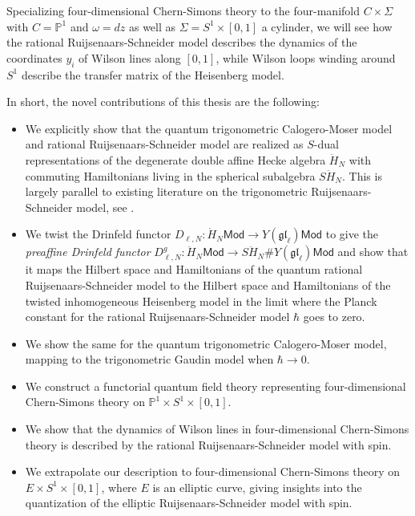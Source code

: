 \documentclass[11pt]{report}
\theoremstyle{definition}
\theoremstyle{remark}
\theoremstyle{remark}
\renewcommand{\P}{\mathbb{P}}
\begin{document}
Specializing four-dimensional Chern-Simons theory to the four-manifold $C \times \Sigma$ with $C = \P^1$ and $\omega = dz$ as well as $\Sigma = S^1 \times [0,1]$ a cylinder, we will see how the rational Ruijsenaars-Schneider model describes the dynamics of the coordinates $y_i$ of Wilson lines along $[0,1]$, while Wilson loops winding around $S^1$ describe the transfer matrix of the Heisenberg model.

In short, the novel contributions of this thesis are the following:
\begin{itemize}
\item We explicitly show that the quantum trigonometric Calogero-Moser model and rational Ruijsenaars-Schneider model are realized as $S$-dual representations of the degenerate double affine Hecke algebra $\ddot H_N$ with commuting Hamiltonians living in the spherical subalgebra $S\ddot H_N$. This is largely parallel to existing literature on the trigonometric Ruijsenaars-Schneider model, see \cite{article:lamers:2022}.
\item We twist the Drinfeld functor $D_{\ell,N}: \dot H_N \mathsf{Mod} \to Y(\mathfrak{gl}_\ell) \mathsf{Mod}$ to give the \emph{preaffine Drinfeld functor} $D_{\ell,N}^g: \ddot H_N \mathsf{Mod} \to S\ddot H_N \# Y(\mathfrak{gl}_\ell) \mathsf{Mod}$ and show that it maps the Hilbert space and Hamiltonians of the quantum rational Ruijsenaars-Schneider model to the Hilbert space and Hamiltonians of the twisted inhomogeneous Heisenberg model in the limit where the Planck constant for the rational Ruijsenaars-Schneider model $\hbar$ goes to zero.
\item We show the same for the quantum trigonometric Calogero-Moser model, mapping to the trigonometric Gaudin model when $\hbar \to 0$.
\item We construct a functorial quantum field theory representing four-dimensional Chern-Simons theory on $\P^1 \times S^1 \times [0,1]$.
\item We show that the dynamics of Wilson lines in four-dimensional Chern-Simons theory is described by the rational Ruijsenaars-Schneider model with spin.
\item We extrapolate our description to four-dimensional Chern-Simons theory on $E \times S^1 \times [0,1]$, where $E$ is an elliptic curve, giving insights into the quantization of the elliptic Ruijsenaars-Schneider model with spin.
\end{itemize}
\end{document}
